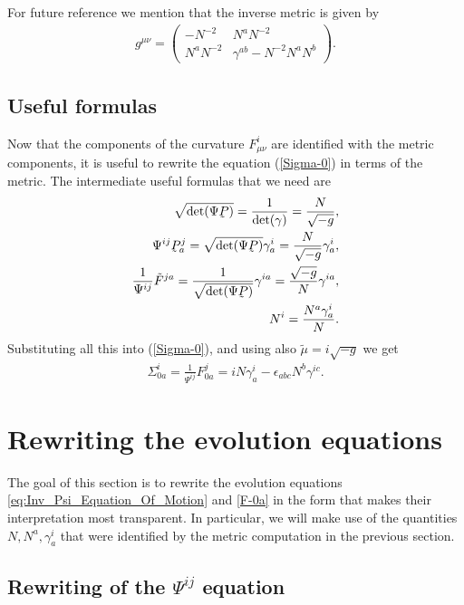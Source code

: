 \documentclass[10pt]{report}
\newcommand{\utilde}[1]{\underaccent{\tilde}{#1}}
\theoremstyle{definition}
\newcommand{\im}{i}
\begin{document}
For future reference we mention that the inverse metric is given by
\begin{align}
g^{\mu\nu} = \left( \begin{array}{cc} - N^{-2}  & N^a N^{-2} \\ N^a N^{-2} & \gamma^{ab} - N^{-2} N^a N^b \end{array}\right).
\end{align}

\subsection{Useful formulas}

Now that the components of the curvature $F^i_{\mu\nu}$ are identified with the metric components, it is useful to rewrite the equation (\ref{Sigma-0}) in terms of the metric. The intermediate useful formulas that we need are
\begin{align}\label{useful-formulas}
\sqrt{{\rm det}(\Psi\utilde{P})} = \frac{1}{{\rm det}(\gamma)} = \frac{N}{\sqrt{-g}}, \\ \nonumber
\Psi^{ij} \utilde{P}^j_a = \sqrt{{\rm det}(\Psi\utilde{P})} \gamma^i_a = \frac{N}{\sqrt{-g}} \gamma^i_a, \\
\nonumber
\frac{1}{\Psi^{ij}} \tilde{F}^{ja} = \frac{1}{\sqrt{{\rm det}(\Psi\utilde{P})}} \gamma^{ia} = \frac{\sqrt{-g}} {N}\gamma^{ia}, \\ \nonumber
N^i = \frac{N^a \gamma^i_a}{N}.
\end{align}
Substituting all this into (\ref{Sigma-0}), and using also $\tilde{\mu}=\im \sqrt{-g}$ we get
\begin{align}\label{Sigma-0-useful}
\Sigma^i_{0a}= \frac{1}{\Psi^{ij}} F^j_{0a} = \im N \gamma^i_a - \epsilon_{abc} N^b \gamma^{ic}.
\end{align}

\section{Rewriting the evolution equations} \label{sec:num-pure-con-evol-system}

The goal of this section is to rewrite the evolution equations \cref{eq:Inv_Psi_Equation_Of_Motion} and \cref{F-0a} in the form that makes their interpretation most transparent. In particular, we will make use of the quantities $N, N^a, \gamma^i_a$ that were identified by the metric computation in the previous section. 

\subsection{Rewriting of the $\Psi^{ij}$ equation}
\end{document}
